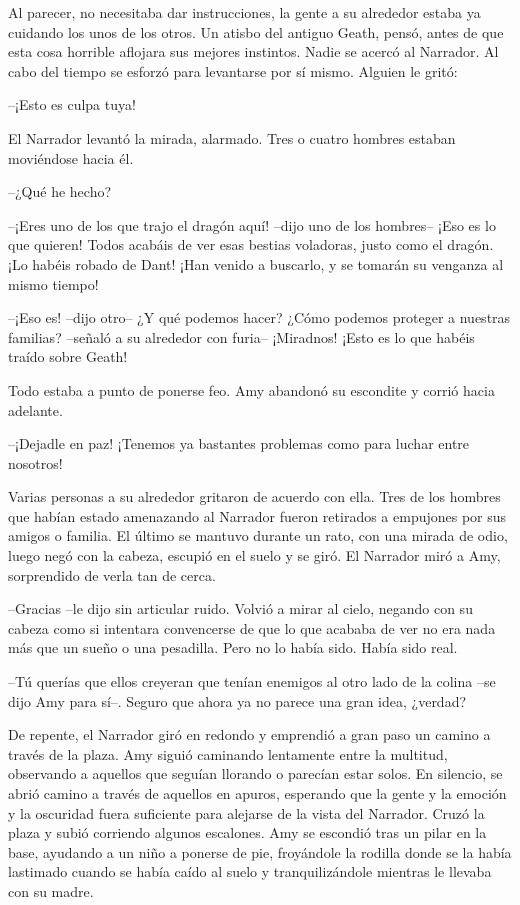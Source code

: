 {Al parecer, no necesitaba dar instrucciones, la gente a su alrededor
	estaba ya cuidando los unos de los otros. Un atisbo del antiguo Geath,
	pensó, antes de que esta cosa horrible aflojara sus mejores instintos.
	Nadie se acercó al Narrador. Al cabo del tiempo se esforzó para
levantarse por sí mismo. Alguien le gritó:}

{--¡Esto es culpa tuya!}

{El Narrador levantó la mirada, alarmado. Tres o cuatro hombres estaban
moviéndose hacia él.}

{--¿Qué he hecho?}

{--¡Eres uno de los que trajo el dragón aquí! --dijo uno de los
	hombres-- ¡Eso es lo que quieren! Todos acabáis de ver esas bestias
	voladoras, justo como el dragón. ¡Lo habéis robado de Dant! ¡Han venido
a buscarlo, y se tomarán su venganza al mismo tiempo!}

{--¡Eso es! --dijo otro-- ¿Y qué podemos hacer? ¿Cómo podemos proteger
	a nuestras familias? --señaló a su alrededor con furia-- ¡Miradnos!
¡Esto es lo que habéis traído sobre Geath!}

{Todo estaba a punto de ponerse feo. Amy abandonó su escondite y corrió
hacia adelante.}

{--¡Dejadle en paz! ¡Tenemos ya bastantes problemas como para luchar
entre nosotros!}

{Varias personas a su alrededor gritaron de acuerdo con ella. Tres de
	los hombres que habían estado amenazando al Narrador fueron retirados a
	empujones por sus amigos o familia. El último se mantuvo durante un
	rato, con una mirada de odio, luego negó con la cabeza, escupió en el
	suelo y se giró. El Narrador miró a Amy, sorprendido de verla tan de
cerca.}

{--Gracias --le dijo sin articular ruido. Volvió a mirar al cielo,
	negando con su cabeza como si intentara convencerse de que lo que
	acababa de ver no era nada más que un sueño o una pesadilla. Pero no lo
había sido. Había sido real.}

{--Tú querías que ellos creyeran que tenían enemigos al otro lado de
	la colina --se dijo Amy para sí--. Seguro que ahora ya no parece una
gran idea, ¿verdad?}

{De repente, el Narrador giró en redondo y emprendió a gran paso un
	camino a través de la plaza. Amy siguió caminando lentamente entre la
	multitud, observando a aquellos que seguían llorando o parecían estar
	solos. En silencio, se abrió camino a través de aquellos en apuros,
	esperando que la gente y la emoción y la oscuridad fuera suficiente para
	alejarse de la vista del Narrador. Cruzó la plaza y subió corriendo
	algunos escalones. Amy se escondió tras un pilar en la base, ayudando a
	un niño a ponerse de pie, froyándole la rodilla donde se la había
	lastimado cuando se había caído al suelo y tranquilizándole mientras le
llevaba con su madre.}

